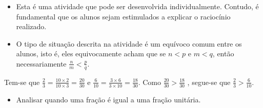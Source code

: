 \begin{orientacoes}{}{}

\begin{itemize} %
    \item       Esta é uma atividade que pode ser desenvolvida individualmente.
Contudo, é fundamental que os alunos sejam estimulados a explicar o raciocínio
realizado.
    \item       O tipo de situação descrita na atividade é um equívoco comum
entre os alunos, isto é, eles equivocamente acham que se       $n < p$       e
    $m < q$, então necessariamente       $\frac{n}{m} < \frac{p}{q}$.
\end{itemize} %




\end{orientacoes}

\begin{solucao}{}{}
  Tem-se que   $\frac{2}{3} = \frac{10 \times 2}{10 \times 3} = \frac{20}{30}$
e
  $\frac{6}{10} = \frac{3 \times 6}{3 \times 10} = \frac{18}{30}$.
  Como   $\frac{20}{30} > \frac{18}{30}$  , segue-se que   $\frac{2}{3} >
\frac{6}{10}$.
\end{solucao}

\begin{objetivos}[label=chap4-ativ22]{}{}

 
\begin{itemize} %
    \item       Analisar quando uma fração é igual a uma fração unitária.
\end{itemize} %
\end{objetivos}

